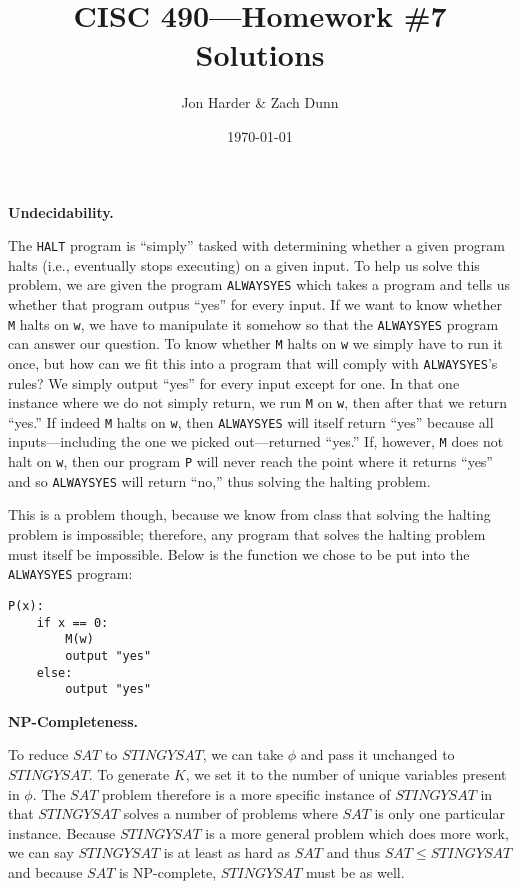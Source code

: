 \documentclass[11pt, letterpaper]{article}
\title{CISC 490---Homework \#7 Solutions}
\author{Jon Harder \& Zach Dunn}
\date{\today}
\newcommand{\solution}[1]{\noindent{\textbf{Solution #1:}}}
\newcommand{\myskip}{\vskip 0.5in}
\begin{document}
\maketitle

\solution{1} \textbf{Undecidability.}

The \texttt{HALT} program is ``simply'' tasked with determining whether a given
program halts (i.e., eventually stops executing) on a given input. To help us
solve this problem, we are given the program \texttt{ALWAYSYES} which takes a
program and tells us whether that program outpus ``yes'' for every input. If we
want to know whether \texttt{M} halts on \texttt{w}, we have to manipulate it
somehow so that the \texttt{ALWAYSYES} program can answer our question. To know
whether \texttt{M} halts on \texttt{w} we simply have to run it once, but how
can we fit this into a program that will comply with \texttt{ALWAYSYES}'s rules?
We simply output ``yes'' for every input except for one. In that one instance
where we do not simply return, we run \texttt{M} on \texttt{w}, then after that
we return ``yes.'' If indeed \texttt{M} halts on \texttt{w}, then
\texttt{ALWAYSYES} will itself return ``yes'' because all inputs---including the
one we picked out---returned ``yes.'' If, however, \texttt{M} does not halt on
\texttt{w}, then our program \texttt{P} will never reach the point where it
returns ``yes'' and so \texttt{ALWAYSYES} will return ``no,'' thus solving the
halting problem.

This is a problem though, because we know from class that solving the halting
problem is impossible; therefore, any program that solves the halting problem
must itself be impossible. Below is the function we chose to be put into the
\texttt{ALWAYSYES} program:

\begin{verbatim}
P(x):
    if x == 0:
        M(w)
        output "yes"
    else:
        output "yes"
\end{verbatim}

\myskip

\solution{2} \textbf{NP-Completeness.}

To reduce $SAT$ to $STINGYSAT$, we can take $\phi$ and pass it unchanged to
$STINGYSAT$. To generate $K$, we set it to the number of unique variables
present in $\phi$. The $SAT$ problem therefore is a more specific instance of
$STINGYSAT$ in that $STINGYSAT$ solves a number of problems where $SAT$ is only
one particular instance.  Because $STINGYSAT$ is a more general problem which
does more work, we can say $STINGYSAT$ is at least as hard as $SAT$ and thus
$SAT \leq STINGYSAT$ and because $SAT$ is NP-complete, $STINGYSAT$ must be as
well.
\end{document}
